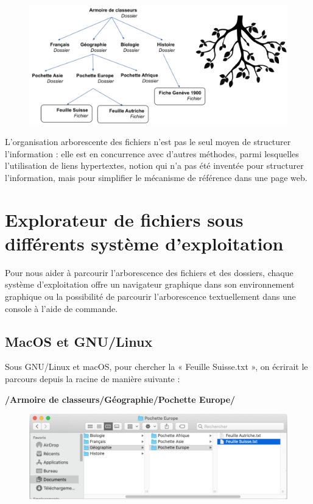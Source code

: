 \documentclass[11pt, a4paper]{book}
\begin{document}
\begin{figure}[h!]
\centering
\includegraphics[width=15cm]{images/arborescence2}
\end{figure}
L’organisation arborescente des fichiers n’est pas le seul moyen de structurer l’information : elle est en concurrence avec d’autres méthodes, parmi lesquelles l’utilisation de liens hypertextes, notion qui n’a pas été inventée pour structurer l’information, mais pour simplifier le mécanisme de référence dans une page web.

\section{Explorateur de fichiers sous différents système d'exploitation}
Pour nous aider à parcourir l’arborescence des fichiers et des dossiers, chaque système d’exploitation offre un navigateur graphique dans son environnement graphique ou la possibilité de parcourir l'arborescence textuellement dans une console à l'aide de commande.

\subsection{MacOS et GNU/Linux}
Sous GNU/Linux et macOS, pour chercher la « Feuille Suisse.txt », on écrirait le parcours depuis la racine de manière suivante :

\begin{center}
{ \bf /Armoire de classeurs/Géographie/Pochette Europe/
}
\end{center}
\begin{figure}[h!]
\centering
\includegraphics[width=15cm]{images/fichierMac}
\end{figure}
\end{document}
